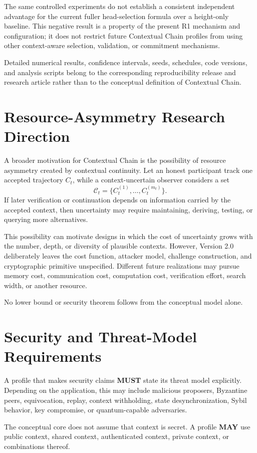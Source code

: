 \documentclass[11pt]{article}
\begin{document}
The same controlled experiments do not establish a consistent independent advantage for the
current fuller head-selection formula over a height-only baseline. This negative result is a
property of the present R1 mechanism and configuration; it does not restrict future Contextual
Chain profiles from using other context-aware selection, validation, or commitment mechanisms.

Detailed numerical results, confidence intervals, seeds, schedules, code versions, and analysis
scripts belong to the corresponding reproducibility release and research article rather than to
the conceptual definition of Contextual Chain.

\section{Resource-Asymmetry Research Direction}
A broader motivation for Contextual Chain is the possibility of resource asymmetry created by
contextual continuity. Let an honest participant track one accepted trajectory $C_t$, while a
context-uncertain observer considers a set
\[
\mathcal{C}_t=\{C_t^{(1)},\ldots,C_t^{(m_t)}\}.
\]
If later verification or continuation depends on information carried by the accepted context,
then uncertainty may require maintaining, deriving, testing, or querying more alternatives.

This possibility can motivate designs in which the cost of uncertainty grows with the number,
depth, or diversity of plausible contexts. However, Version 2.0 deliberately leaves the cost
function, attacker model, challenge construction, and cryptographic primitive unspecified.
Different future realizations may pursue memory cost, communication cost, computation cost,
verification effort, search width, or another resource.

No lower bound or security theorem follows from the conceptual model alone.

\section{Security and Threat-Model Requirements}
A profile that makes security claims \textbf{MUST} state its threat model explicitly. Depending on
the application, this may include malicious proposers, Byzantine peers, equivocation, replay,
context withholding, state desynchronization, Sybil behavior, key compromise, or quantum-capable
adversaries.

The conceptual core does not assume that context is secret. A profile \textbf{MAY} use public
context, shared context, authenticated context, private context, or combinations thereof.
\end{document}
